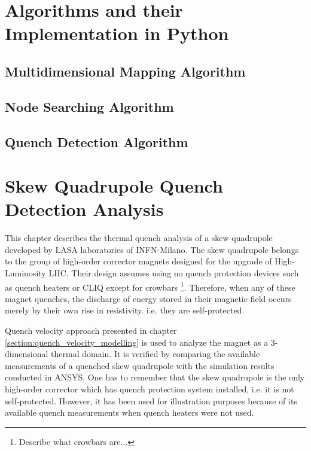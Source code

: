 \documentclass{article}
\begin{document}
\clearpage
\section{Algorithms and their Implementation in Python}
\label{section:python_framework}


\subsection{Multidimensional Mapping Algorithm}
\label{subsection:multidimensional_mapping_algorithm}


\subsection{Node Searching Algorithm}
\label{subsection:node_searching_algorithm}


\subsection{Quench Detection Algorithm}
\label{subsection:quench_detection_algorithm}


\clearpage
\section{Skew Quadrupole Quench Detection Analysis}
\label{section:skew_quadrupole_quench_detection_analysis}

This chapter describes the thermal quench analysis of a skew quadrupole developed by LASA laboratories of INFN-Milano. The skew quadrupole belongs to the group of high-order corrector magnets designed for the upgrade of High-Luminosity LHC. Their design assumes using no quench protection devices such as quench heaters or CLIQ except for crowbars \footnote{Describe what crowbars are...}. Therefore, when any of these magnet quenches, the discharge of energy stored in their magnetic field occurs merely by their own rise in resistivity. i.e. they are self-protected.

Quench velocity approach presented in chapter \ref{section:quench_velocity_modelling} is used to analyze the magnet as a 3-dimensional thermal domain. It is verified by comparing the available measurements of a quenched skew quadrupole with the simulation results conducted in ANSYS. One has to remember that the skew quadrupole is the only high-order corrector which has quench protection system installed, i.e. it is not self-protected. However, it has been used for illustration purposes because of its available quench measurements when quench heaters were not used. 
\end{document}
